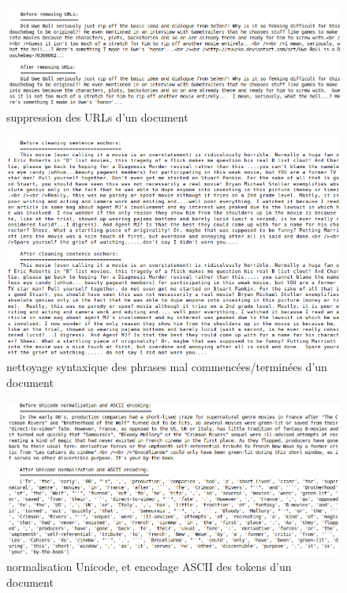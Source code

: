 \documentclass[12pt,a4paper]{report}
\theoremstyle{definition}
\begin{document}
\begin{appendices}
\begin{figure}[!ht]
  \centering
  \includegraphics[scale=0.45]{images/snapshots/preprocessing/remove_urls.png}
  \caption{suppression des URLs d'un document}
  \label{fig:remove_urls}
\end{figure}

\begin{figure}[!ht]
  \centering
  \includegraphics[scale=0.6]{images/snapshots/preprocessing/clean_sentence_anchors.png}
  \caption{nettoyage syntaxique des phrases mal commencées/terminées d'un document}
  \label{fig:clean_sentence_anchors}
\end{figure}

\begin{figure}[!ht]
  \centering
  \includegraphics[scale=0.45]{images/snapshots/preprocessing/remove_non_ascii.png}
  \caption{normalisation Unicode, et encodage ASCII des tokens d'un document}
  \label{fig:remove_non_ascii}
\end{figure}


\end{appendices}
\end{document}
